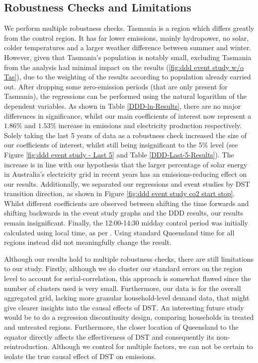 \subsection{Robustness Checks and Limitations}

We perform multiple robustness checks. Tasmania is a region which differs greatly from the control region. It has far lower emissions, mainly hydropower, no solar, colder temperatures and a larger weather difference between summer and winter.
However, given that Tasmania's population is notably small, excluding Tasmania from the analysis had minimal impact on the results (\ref{fig:ddd event study w/o Tas}), due to the weighting of the results according to population already carried out.
After dropping some zero-emission periods (that are only present for Tasmania), the regressions can be performed using the natural logarithm of the dependent variables. As shown in Table \ref{DDD-ln-Results}, there are no major differences in significance, whilst our main coefficients of interest now represent a $1.86\%$ and $1.53\%$ increase in emissions and electricity production respectively. Solely taking the last 5 years of data as a robustness check increased the size of our coefficients of interest, whilst still being insignificant to the 5\% level (see Figure \ref{fig:ddd event study - Last 5} and Table \ref{DDD-Last-5-Results}). The increase is in line with our hypothesis that the larger percentage of solar energy in Australia's electricity grid in recent years has an emissions-reducing effect on our results. Additionally, we separated our regressions and event studies by DST transition direction, as shown in Figure \ref{fig:ddd event study co2 start stop}. Whilst different coefficients are observed between shifting the time forwards and shifting backwards in the event study graphs and the \ac{DDD} results, our results remain insignificant.
Finally, the 12:00-14:30 midday control period was initially calculated using local time, as per \cite{kellogg_daylight_2008}. Using standard Queensland time for all regions instead did not meaningfully change the result.

Although our results hold to multiple robustness checks, there are still limitations to our study. Firstly, although we do cluster our standard errors on the region level to account for serial-correlation, this approach is somewhat flawed since the number of clusters used is very small. 
Furthermore, our data is for the overall aggregated grid, lacking more granular household-level demand data, that might give clearer insights into the causal effects of \ac{DST}. An interesting future study would be to do a regression discontinuity design, comparing households in treated and untreated regions. Furthermore, the closer location of Queensland to the equator directly affects the effectiveness of \ac{DST} and consequently its non-reintroduction. Although we control for multiple factors, we can not be certain to isolate the true causal effect of \ac{DST} on emissions. 